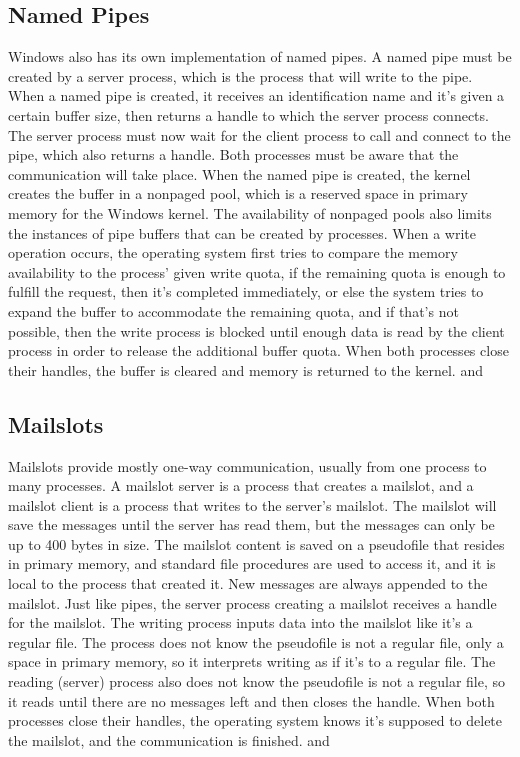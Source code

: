 \documentclass[12pt]{article}
\begin{document}
\subsection{Named Pipes}
	Windows also has its own implementation of named pipes. A named pipe must be created by a server process, which is the process that will write to the pipe. When a named pipe is created, it receives an identification name and it’s given a certain buffer size, then returns a handle to which the server process connects. The server process must now wait for the client process to call and connect to the pipe, which also returns a handle. Both processes must be aware that the communication will take place. When the named pipe is created, the kernel creates the buffer in a nonpaged pool, which is a reserved space in primary memory for the Windows kernel. The availability of nonpaged pools also limits the instances of pipe buffers that can be created by processes. When a write operation occurs, the operating system first tries to compare the memory availability to the process’ given write quota, if the remaining quota is enough to fulfill the request, then it's completed immediately, or else the system tries to expand the buffer to accommodate the remaining quota, and if that’s not possible, then the write process is blocked until enough data is read by the client process in order to release the additional buffer quota. When both processes close their handles, the buffer is cleared and memory is returned to the kernel. \cite{winpipes:1} and \cite{winpipes:2}
	
\subsection{Mailslots}
	Mailslots provide mostly one-way communication, usually from one process to many processes. A mailslot server is a process that creates a mailslot, and a mailslot client is a process that writes to the server’s mailslot. The mailslot will save the messages until the server has read them, but the messages can only be up to 400 bytes in size. The mailslot content is saved on a pseudofile that resides in primary memory, and standard file procedures are used to access it, and it is local to the process that created it. New messages are always appended to the mailslot. Just like pipes, the server process creating a mailslot receives a handle for the mailslot. The writing process inputs data into the mailslot like it’s a regular file. The process does not know the pseudofile is not a regular file, only a space in primary memory, so it interprets writing as if it’s to a regular file. The reading (server) process also does not know the pseudofile is not a regular file, so it reads until there are no messages left and then closes the handle. When both processes close their handles, the operating system knows it’s supposed to delete the mailslot, and the communication is finished. \cite{winmailslot:1} and \cite{winmailslot:2}
\end{document}
